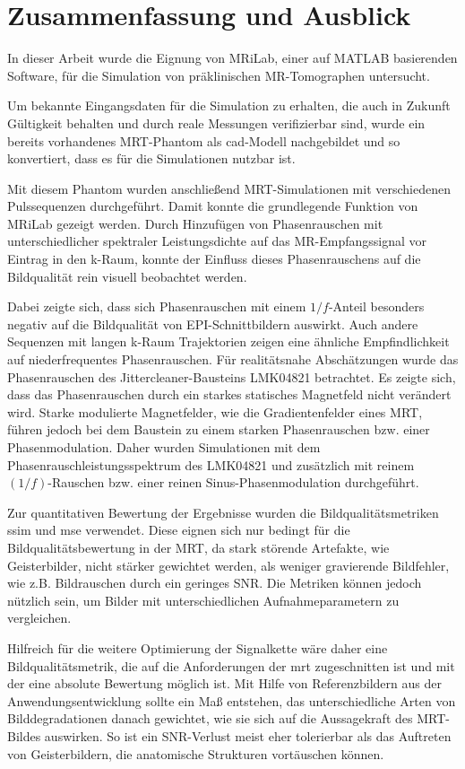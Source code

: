 \chapter{Zusammenfassung und Ausblick}
In dieser Arbeit wurde die Eignung von MRiLab, einer auf MATLAB basierenden Software, für die Simulation von präklinischen MR-Tomographen untersucht.

Um bekannte Eingangsdaten für die Simulation zu erhalten, die auch in Zukunft Gültigkeit behalten und durch reale Messungen verifizierbar sind, wurde ein bereits vorhandenes MRT-Phantom als \gls{cad}-Modell nachgebildet und so konvertiert, dass es für die Simulationen nutzbar ist.

Mit diesem Phantom wurden anschließend MRT-Simulationen mit verschiedenen Pulssequenzen durchgeführt. Damit konnte die grundlegende Funktion von MRiLab gezeigt werden. Durch Hinzufügen von Phasen\-rauschen mit unterschiedlicher spektraler Leistungsdichte auf das MR-\-Empfangs\-signal vor Eintrag in den k-Raum, konnte der Einfluss dieses Phasenrauschens auf die Bildqualität rein visuell beobachtet werden.

Dabei zeigte sich, dass sich Phasenrauschen mit einem $1/f$-Anteil besonders negativ auf die Bildqualität von EPI-Schnittbildern auswirkt. Auch andere Sequenzen mit langen k-Raum Trajektorien zeigen eine ähnliche Empfindlichkeit auf niederfrequentes Phasenrauschen. Für realitätsnahe Abschätzungen wurde das Phasenrauschen des Jittercleaner-Bausteins LMK04821 betrachtet. Es zeigte sich, dass das Phasenrauschen durch ein starkes statisches Magnetfeld nicht verändert wird. Starke modulierte Magnetfelder, wie die Gradientenfelder eines MRT, führen jedoch bei dem Baustein zu einem starken Phasenrauschen bzw. einer Phasenmodulation. Daher wurden Simulationen mit dem Phasenrauschleistungsspektrum des LMK04821 und zusätzlich mit reinem $(1/f)$-Rauschen bzw. einer reinen Sinus-Phasenmodulation durchgeführt.

Zur quantitativen Bewertung der Ergebnisse wurden die Bildqualitätsmetriken \gls{ssim} und \gls{mse} verwendet. Diese eignen sich nur bedingt für die Bildqualitätsbewertung in der MRT, da stark störende Artefakte, wie Geisterbilder, nicht stärker gewichtet werden, als weniger gravierende Bildfehler, wie z.B. Bildrauschen durch ein geringes SNR. Die Metriken können jedoch nützlich sein, um Bilder mit unterschiedlichen Aufnahmeparametern zu vergleichen.

Hilfreich für die weitere Optimierung der Signalkette wäre daher eine Bildqualitätsmetrik, die auf die Anforderungen der \gls{mrt} zugeschnitten ist und mit der eine absolute Bewertung möglich ist. Mit Hilfe von Referenzbildern aus der Anwendungsentwicklung sollte ein Maß entstehen, das unterschiedliche Arten von Bilddegradationen danach gewichtet, wie sie sich auf die Aussagekraft des MRT-Bildes auswirken. So ist ein SNR-Verlust meist eher tolerierbar als das Auftreten von Geisterbildern, die anatomische Strukturen vortäuschen können. 